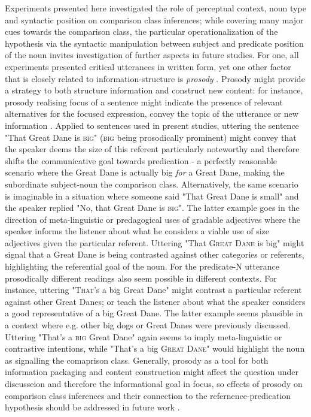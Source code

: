 Experiments presented here investigated the role of perceptual context, noun type and syntactic position on comparison class inferences; while covering many major cues towards the comparison class, the particular operationalization of the hypothesis via the syntactic manipulation between subject and predicate position of the noun invites investigation of further aspects in future studies. For one, all experiments presented critical utterances in written form, yet one other factor that is closely related to information-structure is \emph{prosody} \parencite{krifka2008basic}. Prosody might provide a strategy to both structure information and construct new content: for instance, prosody realising focus of a sentence might indicate the presence of relevant alternatives for the focused expression, convey the topic of the utterance or new information \parencite{krifka2008basic, selkirk1995sentence}. 
Applied to sentences used in present studies, uttering the sentence "That Great Dane is \textsc{big}" (\textsc{big} being prosodically prominent) might convey that the speaker deems the size of this referent particularly noteworthy and therefore shifts the communicative goal towards predication - a perfectly reasonable scenario where the Great Dane is actually big \emph{for} a Great Dane, making the subordinate subject-noun the comparison class.  Alternatively, the same scenario is imaginable in a situation where someone said "That Great Dane is small" and the speaker replied "No, that Great Dane is \textsc{big}". The latter example goes in the direction of meta-linguistic or predagogical uses of gradable adjectives where the speaker informs the listener about what he considers a viable use of size adjectives given the particular referent. Uttering "That \textsc{Great Dane} is big" might signal that a Great Dane is being contrasted against other categories or referents, highlighting the referential goal of the noun.
For the predicate-N utterance prosodically different readings also seem possible in different contexts. For instance, uttering "\textsc{That}'s a big Great Dane" might contrast a particular referent against other Great Danes; or teach the listener about what the speaker considers a good representative of a big Great Dane. The latter example seems plausible in a context where e.g. other big dogs or Great Danes were previously discussed. Uttering "That's a \textsc{big} Great Dane" again seems to imply meta-linguistic or contrastive intentions, while "That's a big \textsc{Great Dane}" would highlight the noun as signalling the comaprison class. 
Generally, prosody as a tool for both information packaging and content construction might affect the question under discusseion and therefore the informational goal in focus, so effects of prosody on comparison class inferences and their connection to the refernence-predication hypothesis should be addressed in future work \parencite{krifka2008basic}. 

